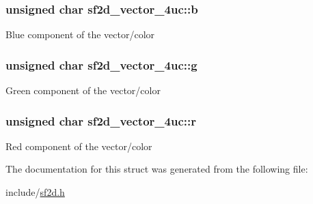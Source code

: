 \subsubsection[{b}]{\setlength{\rightskip}{0pt plus 5cm}unsigned char sf2d\+\_\+vector\+\_\+4uc\+::b}\label{structsf2d__vector__4uc_a4d2cb3735537b2f162955a9ec88931cd}
Blue component of the vector/color \hypertarget{structsf2d__vector__4uc_a0aa65c7dcc7f056612d98c185a042e91}{}
\subsubsection[{g}]{\setlength{\rightskip}{0pt plus 5cm}unsigned char sf2d\+\_\+vector\+\_\+4uc\+::g}\label{structsf2d__vector__4uc_a0aa65c7dcc7f056612d98c185a042e91}
Green component of the vector/color \hypertarget{structsf2d__vector__4uc_a7a05fef1e4716854c60679ebc78d6c16}{}
\subsubsection[{r}]{\setlength{\rightskip}{0pt plus 5cm}unsigned char sf2d\+\_\+vector\+\_\+4uc\+::r}\label{structsf2d__vector__4uc_a7a05fef1e4716854c60679ebc78d6c16}
Red component of the vector/color 

The documentation for this struct was generated from the following file\+:\begin{DoxyCompactItemize}
\item 
include/\hyperlink{sf2d_8h}{sf2d.\+h}\end{DoxyCompactItemize}
